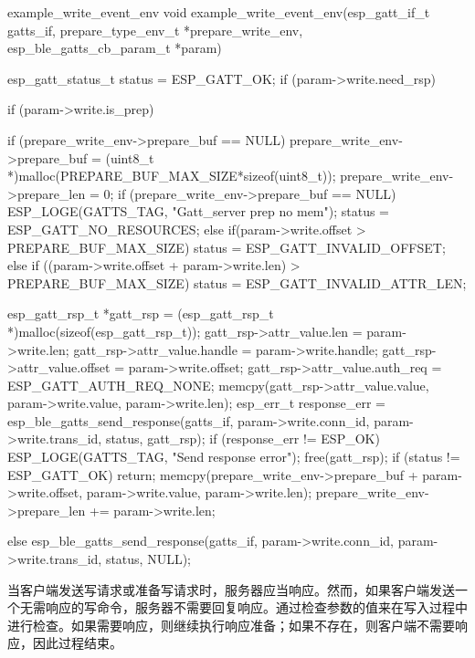 \documentclass[lang=cn,newtx,10pt,scheme=chinese]{elegantbook}
\begin{document}
\begin{mycode}{example\_write\_event\_env}
void example_write_event_env(esp_gatt_if_t gatts_if, prepare_type_env_t *prepare_write_env, esp_ble_gatts_cb_param_t *param){
    esp_gatt_status_t status = ESP_GATT_OK;
    if (param->write.need_rsp){
       if (param->write.is_prep){
            if (prepare_write_env->prepare_buf == NULL){
                prepare_write_env->prepare_buf = (uint8_t *)malloc(PREPARE_BUF_MAX_SIZE*sizeof(uint8_t));
                prepare_write_env->prepare_len = 0;
                if (prepare_write_env->prepare_buf == NULL) {
                    ESP_LOGE(GATTS_TAG, "Gatt_server prep no mem\n");
                    status = ESP_GATT_NO_RESOURCES;
                }
            } else {
                if(param->write.offset > PREPARE_BUF_MAX_SIZE) {
                    status = ESP_GATT_INVALID_OFFSET;
                }
                else if ((param->write.offset + param->write.len) > PREPARE_BUF_MAX_SIZE) {
                    status = ESP_GATT_INVALID_ATTR_LEN;
                }
            }

            esp_gatt_rsp_t *gatt_rsp = (esp_gatt_rsp_t *)malloc(sizeof(esp_gatt_rsp_t));
            gatt_rsp->attr_value.len = param->write.len;
            gatt_rsp->attr_value.handle = param->write.handle;
            gatt_rsp->attr_value.offset = param->write.offset;
            gatt_rsp->attr_value.auth_req = ESP_GATT_AUTH_REQ_NONE;
            memcpy(gatt_rsp->attr_value.value, param->write.value, param->write.len);
            esp_err_t response_err = esp_ble_gatts_send_response(gatts_if, param->write.conn_id,  
                                                                 param->write.trans_id, status, gatt_rsp);
            if (response_err != ESP_OK){
               ESP_LOGE(GATTS_TAG, "Send response error\n");
            }
            free(gatt_rsp);
            if (status != ESP_GATT_OK){
                return;
            }
            memcpy(prepare_write_env->prepare_buf + param->write.offset,
                   param->write.value,
                   param->write.len);
            prepare_write_env->prepare_len += param->write.len;

        }else{
            esp_ble_gatts_send_response(gatts_if, param->write.conn_id, param->write.trans_id, status, NULL);
        }
    }
}
\end{mycode}

当客户端发送写请求或准备写请求时，服务器应当响应。然而，如果客户端发送一个无需响应的写命令，服务器不需要回复响应。通过检查参数的值来在写入过程中进行检查。如果需要响应，则继续执行响应准备；如果不存在，则客户端不需要响应，因此过程结束。
\end{document}
